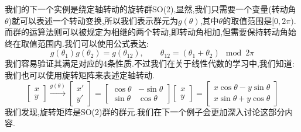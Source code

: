 \begin{example}
	我们的下一个实例是绕定轴转动的旋转群SO(2),显然,我们只需要一个变量(转动角$\theta$)就可以表述一个转动变换,所以我们表示群元为$g(\theta)$,其中$\theta$的取值范围是$[0,2\pi)$.而群的运算法则可以被规定为相继的两个转动,即转动角相加,但需要保持转动角始终在取值范围内.我们可以使用公式表达:
	\begin{equation}
		g(\theta_1)g(\theta_2)=g(\theta_{12}),\qquad\theta_{12}=(\theta_1+\theta_2)\mod 2\pi
	\end{equation}
	我们容易验证其满足对应的4条性质.不过我们在关于线性代数的学习中,我们知道:我们也可以使用旋转矩阵来表述定轴转动.
	\begin{equation}
		\begin{bmatrix}x\\y\end{bmatrix}\xrightarrow{g(\theta)}\begin{bmatrix}x'\\y'\end{bmatrix}=\begin{bmatrix}\cos\theta&-\sin\theta\\\sin\theta&\cos\theta\end{bmatrix}\begin{bmatrix}x\\y\end{bmatrix}=\begin{bmatrix}x\cos\theta-y\sin\theta\\x\sin\theta+y\cos\theta\end{bmatrix}
	\end{equation}
	我们发现,旋转矩阵是SO(2)群的群元.我们在下一个例子会更加深入讨论这部分内容.
\end{example}
